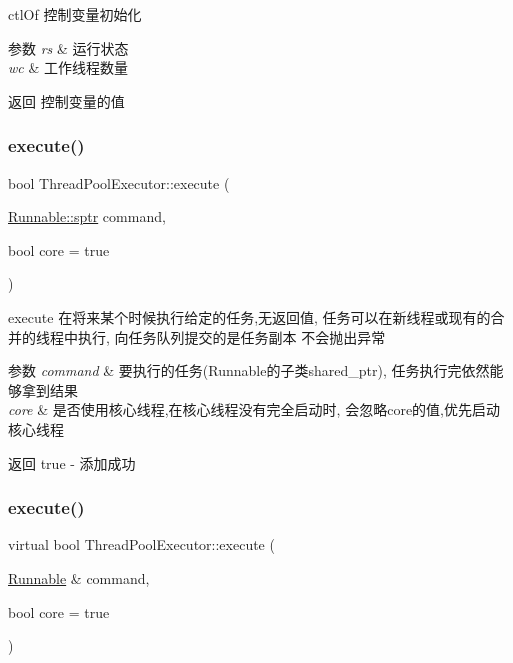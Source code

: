ctl\+Of 控制变量初始化 


\begin{DoxyParams}{参数}
{\em rs} & 运行状态 \\
\hline
{\em wc} & 工作线程数量\\
\hline
\end{DoxyParams}
\begin{DoxyReturn}{返回}
控制变量的值 
\end{DoxyReturn}
\mbox{\label{classThreadPoolExecutor_a4dac3c2435919af5d77aa36069d35bc7}} 
\subsubsection{\texorpdfstring{execute()}{execute()}\hspace{0.1cm}{\footnotesize\ttfamily [1/3]}}
{\footnotesize\ttfamily bool Thread\+Pool\+Executor\+::execute (\begin{DoxyParamCaption}\item[{\hyperlink{classRunnable_abe8d3066c7305401d6f0aad8e70780f2}{Runnable\+::sptr}}]{command,  }\item[{bool}]{core = {\ttfamily true} }\end{DoxyParamCaption})}



execute 在将来某个时候执行给定的任务,无返回值, 任务可以在新线程或现有的合并的线程中执行, 向任务队列提交的是任务副本 不会抛出异常 


\begin{DoxyParams}{参数}
{\em command} & 要执行的任务(Runnable的子类shared\+\_\+ptr), 任务执行完依然能够拿到结果 \\
\hline
{\em core} & 是否使用核心线程,在核心线程没有完全启动时, 会忽略core的值,优先启动核心线程\\
\hline
\end{DoxyParams}
\begin{DoxyReturn}{返回}
true -\/ 添加成功 
\end{DoxyReturn}
\mbox{\label{classThreadPoolExecutor_a523df0545790ef03a82623b05e3b20f9}} 
\subsubsection{\texorpdfstring{execute()}{execute()}\hspace{0.1cm}{\footnotesize\ttfamily [2/3]}}
{\footnotesize\ttfamily virtual bool Thread\+Pool\+Executor\+::execute (\begin{DoxyParamCaption}\item[{\hyperlink{classRunnable}{Runnable} \&}]{command,  }\item[{bool}]{core = {\ttfamily true} }\end{DoxyParamCaption})\hspace{0.3cm}{\ttfamily [virtual]}}



